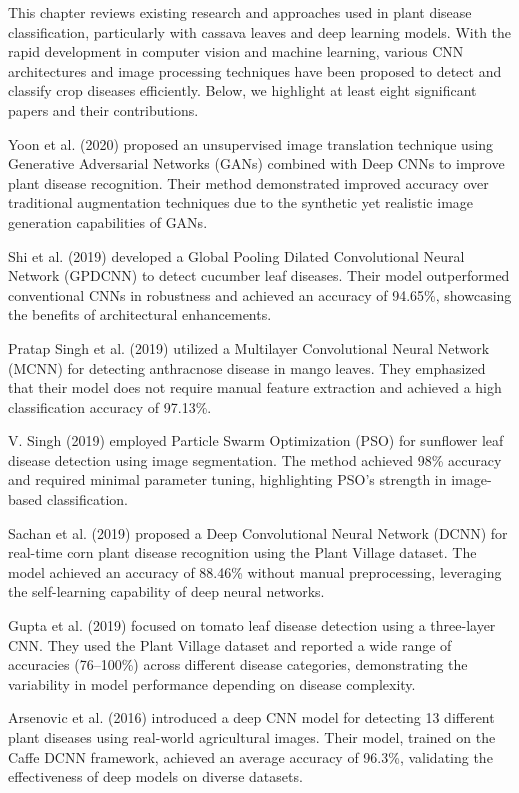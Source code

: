 
This chapter reviews existing research and approaches used in plant disease classification, particularly with cassava leaves and deep learning models. With the rapid development in computer vision and machine learning, various CNN architectures and image processing techniques have been proposed to detect and classify crop diseases efficiently. Below, we highlight at least eight significant papers and their contributions.

Yoon et al. (2020) \cite{das2022boosting} proposed an unsupervised image translation technique using Generative Adversarial Networks (GANs) combined with Deep CNNs to improve plant disease recognition. Their method demonstrated improved accuracy over traditional augmentation techniques due to the synthetic yet realistic image generation capabilities of GANs.

Shi et al. (2019) \cite{sharmin2022investigation} developed a Global Pooling Dilated Convolutional Neural Network (GPDCNN) to detect cucumber leaf diseases. Their model outperformed conventional CNNs in robustness and achieved an accuracy of 94.65\%, showcasing the benefits of architectural enhancements.

Pratap Singh et al. (2019) \cite{uddin2022multi} utilized a Multilayer Convolutional Neural Network (MCNN) for detecting anthracnose disease in mango leaves. They emphasized that their model does not require manual feature extraction and achieved a high classification accuracy of 97.13\%.

V. Singh (2019) employed Particle Swarm Optimization (PSO) for sunflower leaf disease detection using image segmentation. The method achieved 98\% accuracy and required minimal parameter tuning, highlighting PSO’s strength in image-based classification.

Sachan et al. (2019) proposed a Deep Convolutional Neural Network (DCNN) for real-time corn plant disease recognition using the Plant Village dataset. The model achieved an accuracy of 88.46\% without manual preprocessing, leveraging the self-learning capability of deep neural networks.

Gupta et al. (2019) focused on tomato leaf disease detection using a three-layer CNN. They used the Plant Village dataset and reported a wide range of accuracies (76–100\%) across different disease categories, demonstrating the variability in model performance depending on disease complexity.

Arsenovic et al. (2016) introduced a deep CNN model for detecting 13 different plant diseases using real-world agricultural images. Their model, trained on the Caffe DCNN framework, achieved an average accuracy of 96.3\%, validating the effectiveness of deep models on diverse datasets.

